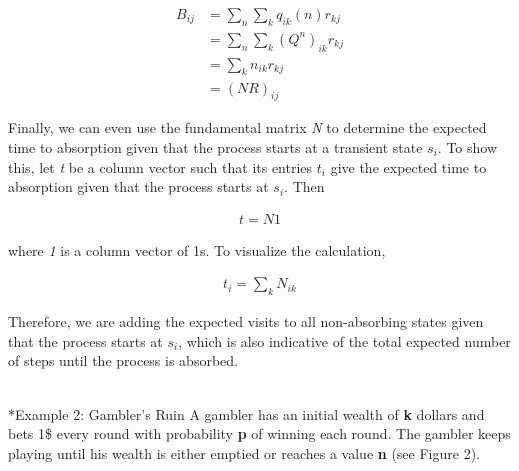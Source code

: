 \documentclass[a4paper, 12pt]{article}
\begin{document}
	\begin{equation*}
	\begin{aligned}
		 B_{ij} &= \sum_{n} \sum_{k} q_{ik}(n)r_{kj} \\
		 		&= \sum_{n} \sum_{k} (Q^n)_{ik} r_{kj} \\
		 		&= \sum_{k} n_{ik}r_{kj} \\
		 		&= (NR)_{ij}

	\end{aligned}
	\end{equation*}

Finally, we can even use the fundamental matrix \textit{N} to determine the expected time to absorption given that the process starts at a transient state $s_i$. To show this, let \textit{t} be a column vector such that its entries $t_i$ give the expected time to absorption given that the process starts at $s_i$. Then

	\begin{equation*}
	\begin{aligned}
		 t = N1
	\end{aligned}
	\end{equation*}
	
where \textit{1} is a column vector of 1s. To visualize the calculation,

	\begin{equation*}
	\begin{aligned}
		 t_i = \sum_{k} N_{ik}
	\end{aligned}
	\end{equation*}
	
Therefore, we are adding the expected visits to all non-absorbing states given that the process starts at $s_i$, which is also indicative of the total expected number of steps until the process is absorbed.
\\
\\
	\begin{tcolorbox}
	*{Example 2: Gambler's Ruin}
    	A gambler has an initial wealth of \textbf{k} dollars and bets 1\$ every round with probability \textbf{p} of winning each 				round.
    	The gambler keeps playing until his wealth is either emptied or reaches a value \textbf{n} (see Figure 2).   
	\end{tcolorbox}	    
        
\end{document}
